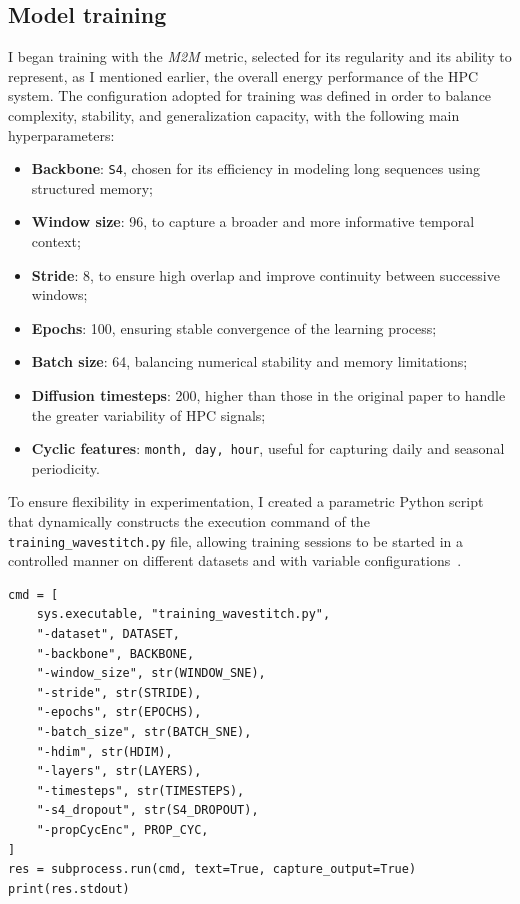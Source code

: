 \subsection{Model training}

I began training with the \emph{M2M} metric, selected for its regularity and its ability to represent, as I mentioned earlier, the overall energy performance of the HPC system.  
The configuration adopted for training was defined in order to balance complexity, stability, and generalization capacity, with the following main hyperparameters:

\begin{itemize}
  \item \textbf{Backbone}: \texttt{S4}, chosen for its efficiency in modeling long sequences using structured memory;
  \item \textbf{Window size}: 96, to capture a broader and more informative temporal context;
  \item \textbf{Stride}: 8, to ensure high overlap and improve continuity between successive windows;
  \item \textbf{Epochs}: 100, ensuring stable convergence of the learning process;
  \item \textbf{Batch size}: 64, balancing numerical stability and memory limitations;
  \item \textbf{Diffusion timesteps}: 200, higher than those in the original paper to handle the greater variability of HPC signals;
  \item \textbf{Cyclic features}: \texttt{month, day, hour}, useful for capturing daily and seasonal periodicity.
\end{itemize}

To ensure flexibility in experimentation, I created a parametric Python script that dynamically constructs the execution command of the \texttt{training\_wavestitch.py} file, allowing training sessions to be started in a controlled manner on different datasets and with variable configurations~\cite{gu2021s4}.

\begin{listing}[H]
\begin{verbatim}
cmd = [
    sys.executable, "training_wavestitch.py",
    "-dataset", DATASET,
    "-backbone", BACKBONE,
    "-window_size", str(WINDOW_SNE),
    "-stride", str(STRIDE),
    "-epochs", str(EPOCHS),
    "-batch_size", str(BATCH_SNE),
    "-hdim", str(HDIM),
    "-layers", str(LAYERS),
    "-timesteps", str(TIMESTEPS),
    "-s4_dropout", str(S4_DROPOUT),
    "-propCycEnc", PROP_CYC,
]
res = subprocess.run(cmd, text=True, capture_output=True)
print(res.stdout)
\end{verbatim}
\end{listing}

